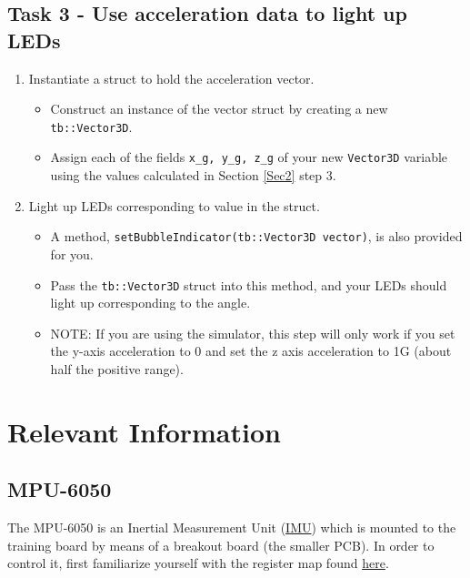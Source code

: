 \documentclass{article}
\begin{document}
    \subsection{Task 3 - Use acceleration data to light up LEDs}
        \begin{enumerate}
            \item Instantiate a struct to hold the acceleration vector.
            \begin{itemize}
                \item Construct an instance of the vector struct by creating a new \texttt{tb::Vector3D}. 
                \item Assign each of the fields \texttt{x\_g, y\_g, z\_g}  of your new \texttt{Vector3D} variable using the values calculated in Section \ref{Sec2} step 3. 
            \end{itemize}
            \item Light up LEDs corresponding to value in the struct.
            \begin{itemize}
                \item A method, \texttt{setBubbleIndicator(tb::Vector3D vector)}, is also provided for you.
                \item Pass the \texttt{tb::Vector3D} struct into this method, and your LEDs should light up corresponding to the angle. 
                \item NOTE: If you are using the simulator, this step will only work if you set the y-axis acceleration to 0 and set the z axis acceleration to 1G (about half the positive range).
            \end{itemize}
        \end{enumerate}
    

\section{Relevant Information}
    \subsection{MPU-6050} \label{readwrite}
        The MPU-6050 is an Inertial Measurement Unit (\href{https://en.wikipedia.org/wiki/Inertial_measurement_unit}{IMU}) which is mounted to the training board by means of a breakout board (the smaller PCB).  
        In order to control it, first familiarize yourself with the register map found \href{https://cdn.sparkfun.com/datasheets/Sensors/Accelerometers/RM-MPU-6000A.pdf}{here}.
        
\end{document}
